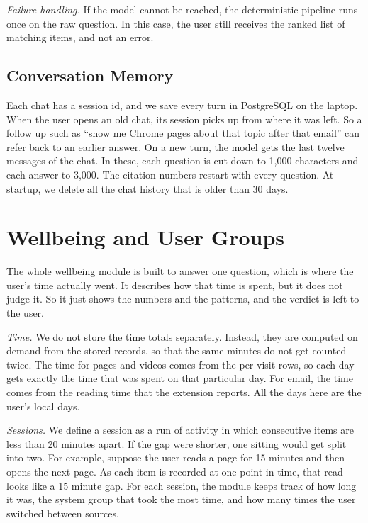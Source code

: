 \documentclass[conference]{IEEEtran}
\begin{document}
\textit{Failure handling.} If the model cannot be reached, the deterministic pipeline runs once on the raw question. In this case, the user still receives the ranked list of matching items, and not an error.

\subsection{Conversation Memory}
Each chat has a session id, and we save every turn in PostgreSQL on the laptop. When the user opens an old chat, its session picks up from where it was left. So a follow up such as ``show me Chrome pages about that topic after that email'' can refer back to an earlier answer. On a new turn, the model gets the last twelve messages of the chat. In these, each question is cut down to 1,000 characters and each answer to 3,000. The citation numbers restart with every question. At startup, we delete all the chat history that is older than 30 days.

\section{Wellbeing and User Groups}\label{sec:wba}
The whole wellbeing module is built to answer one question, which is where the user's time actually went. It describes how that time is spent, but it does not judge it. So it just shows the numbers and the patterns, and the verdict is left to the user.

\textit{Time.} We do not store the time totals separately. Instead, they are computed on demand from the stored records, so that the same minutes do not get counted twice. The time for pages and videos comes from the per visit rows, so each day gets exactly the time that was spent on that particular day. For email, the time comes from the reading time that the extension reports. All the days here are the user's local days.

\textit{Sessions.} We define a session as a run of activity in which consecutive items are less than 20 minutes apart. If the gap were shorter, one sitting would get split into two. For example, suppose the user reads a page for 15 minutes and then opens the next page. As each item is recorded at one point in time, that read looks like a 15 minute gap. For each session, the module keeps track of how long it was, the system group that took the most time, and how many times the user switched between sources.
\end{document}
